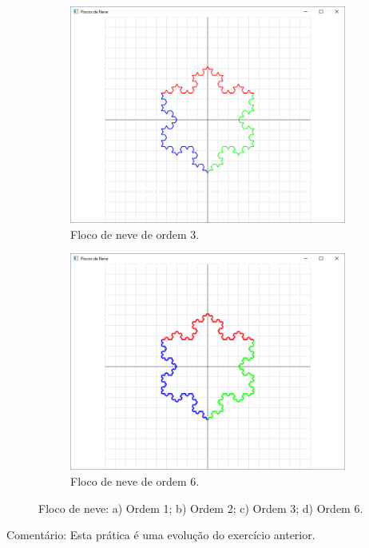 \begin{renumerate}
\begin{enumerate}[label=(\alph*)]
\begin{figure}[H]
\begin{subfigure}[t]{0.3\textwidth}
              \centerline{\includegraphics[width=.9\textwidth]{img/cap4_ex15c}}
              \caption{Floco de neve de ordem $3$.}
              \label{fig:cap04_ex15c}
          \end{subfigure}
          \hfill
          \begin{subfigure}[t]{0.3\textwidth}
              \centerline{\includegraphics[width=.9\textwidth]{img/cap4_ex15d}}
              \caption{Floco de neve de ordem $6$.}
              \label{fig:cap04_ex15d}
          \end{subfigure}

          \caption{
            \label{fig:flocos}%
            Floco de neve: a) Ordem 1; b) Ordem 2; c) Ordem 3; d) Ordem 6.
          }

        \end{figure}
        Comentário: Esta prática é uma evolução do exercício anterior.
%
    \end{enumerate}
    \label{ex:cap04_ex3}


\end{renumerate}

